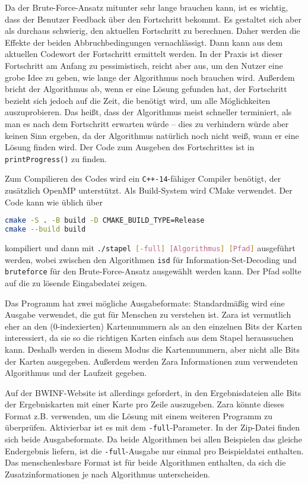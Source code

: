 \documentclass[a4paper,10pt,ngerman]{scrartcl}
\begin{document}
Da der Brute-Force-Ansatz mitunter sehr lange brauchen kann, ist es wichtig, dass der Benutzer Feedback über den Fortschritt bekommt. 
Es gestaltet sich aber als durchaus schwierig, den aktuellen Fortschritt zu berechnen. 
Daher werden die Effekte der beiden Abbruchbedingungen vernachlässigt. 
Dann kann aus dem aktuellen Codewort der Fortschritt ermittelt werden.
In der Praxis ist dieser Fortschritt am Anfang zu pessimistisch, reicht aber aus, um den Nutzer eine grobe Idee zu geben, wie lange der Algorithmus noch brauchen wird. 
Außerdem bricht der Algorithmus ab, wenn er eine Lösung gefunden hat, der Fortschritt bezieht sich jedoch auf die Zeit, die benötigt wird, um alle Möglichkeiten auszuprobieren. 
Das heißt, dass der Algorithmus meist schneller terminiert, als man es nach dem Fortschritt erwarten würde -- dies zu verhindern würde aber keinen Sinn ergeben, da der Algorithmus natürlich noch nicht weiß, wann er eine Lösung finden wird. 
Der Code zum Ausgeben des Fortschrittes ist in \lstinline{printProgress()} zu finden.

Zum Compilieren des Codes wird ein \lstinline{C++-14}-fähiger Compiler benötigt, der zusätzlich OpenMP unterstützt.
Als Build-System wird CMake verwendet. 
Der Code kann wie üblich über 
\begin{lstlisting}[language=bash]
cmake -S . -B build -D CMAKE_BUILD_TYPE=Release
cmake --build build
\end{lstlisting}
kompiliert und dann mit \lstinline[language=bash]{./stapel [-full] [Algorithmus] [Pfad]} ausgeführt werden, wobei zwischen den Algorithmen \lstinline{isd} für Information-Set-Decoding und \lstinline{bruteforce} für den Brute-Force-Ansatz ausgewählt werden kann. Der Pfad sollte auf die zu lösende Eingabedatei zeigen. 

Das Programm hat zwei mögliche Ausgabeformate: Standardmäßig wird eine Ausgabe verwendet, die gut für Menschen zu verstehen ist. Zara ist vermutlich eher an den (0-indexierten) Kartennummern als an den einzelnen Bits der Karten interessiert, da sie so die richtigen Karten einfach aus dem Stapel heraussuchen kann. Deshalb werden in diesem Modus die Kartennummern, aber nicht alle Bits der Karten ausgegeben. Außerdem werden Zara Informationen zum verwendeten Algorithmus und der Laufzeit gegeben.

Auf der BWINF-Website ist allerdings gefordert, in den Ergebnisdateien alle Bits der Ergebniskarten mit einer Karte pro Zeile auszugeben. Zara könnte dieses Format z.B. verwenden, um die Lösung mit einem weiteren Programm zu überprüfen. Aktivierbar ist es mit dem \lstinline{-full}-Parameter. In der Zip-Datei finden sich beide Ausgabeformate. Da beide Algorithmen bei allen Beispielen das gleiche Endergebnis liefern, ist die \lstinline{-full}-Ausgabe nur einmal pro Beispieldatei enthalten. Das menschenlesbare Format ist für beide Algorithmen enthalten, da sich die Zusatzinformationen je nach Algorithmus unterscheiden.
\end{document}
